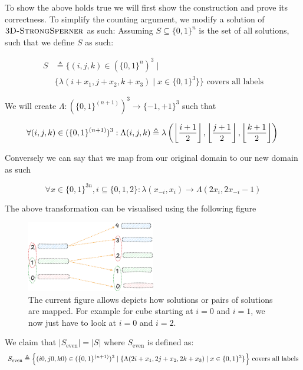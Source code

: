 To show the above holds true we will first show the construction and
prove its correctness.
To simplify the counting argument, we modify a solution of $\textsc{3D-StrongSperner}$
as such: Assuming $S \subseteq \{0,1\}^n$ is the set of all solutions, such that we define $S$ as such:

\begin{align*}
    S &\triangleq \Big\{(i,j,k) \in (\{0,1\}^{n})^3 \mid  \\
      &\{\lambda(i + x_1, j + x_2, k + x_3) \mid x \in \{0,1\}^3 \}\Big\} \text{ covers all labels}
\end{align*}

We will create $\Lambda: (\{0,1\}^{(n+1)})^3 \to \{-1, +1\}^3$ such that
 
$$
    \forall (i,j,k) \in (\{0,1\}^{(n+1)})^3: \Lambda(i,j,k) \triangleq 
\lambda\left( \left\lfloor  \frac{{i+1}}{2}  \right\rfloor, \left\lfloor  \frac{{j+1}}{2} \right\rfloor, \left\lfloor  \frac{{k+1}}{2} \right\rfloor \right)  \\
$$

Conversely we can say that we map from our original domain to our new domain as such

$$
\forall  x \in \{ 0,1 \}^{3n}, i \subseteq \{ 0,1,2 \}: \lambda(x_{-i}, x_{i}) \to \Lambda(2x_{i}, 2x_{-i} -1)
$$

The above transformation can be visualised using the following figure

\begin{figure}[h!]
    \centering
    \includegraphics[width=0.5\textwidth]{assets/1751381227.png}
    \caption{The current figure allows depicts how solutions or pairs of solutions are mapped. For example for cube starting at 
        $i = 0$ and $i = 1$, we now just have to look at $i = 0$ and $i = 2$.}
    \label{fig:main-proof:set_mapping}
\end{figure}


\begin{claim}
    \label{clm:main-proof:trans-claim}
    We claim that $|S_{\text{even}}| = |S|$ where $S_{\text{even}}$  is defined as:
    $$
S_{\text{even}} \triangleq
   \Big\{(i0,j0,k0) \in (\{0,1\}^{(n+1)})^3 \mid  \\
   \{\Lambda(2i + x_1, 2j + x_2, 2k + x_3) \mid x \in \{0,1\}^3 \}\Big\} \text{ covers all labels}
    $$
\end{claim}

